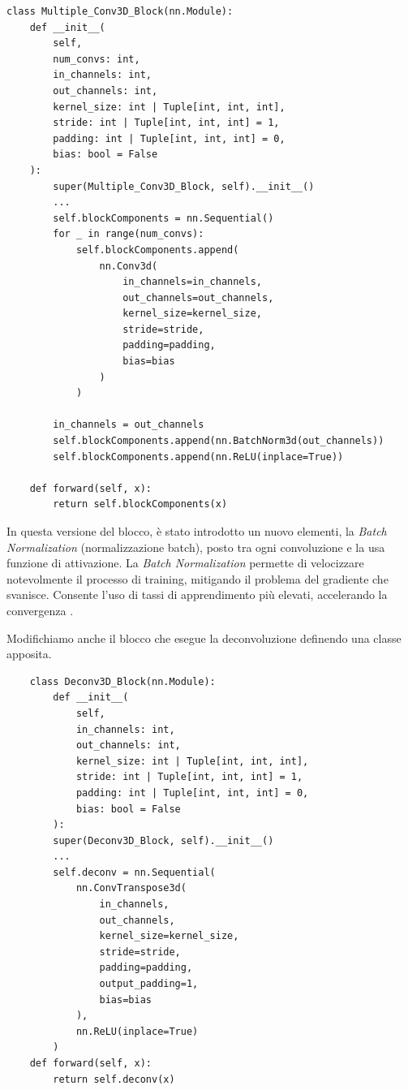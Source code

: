 \begin{lstlisting}
class Multiple_Conv3D_Block(nn.Module):
    def __init__(
        self, 
        num_convs: int, 
        in_channels: int, 
        out_channels: int, 
        kernel_size: int | Tuple[int, int, int], 
        stride: int | Tuple[int, int, int] = 1, 
        padding: int | Tuple[int, int, int] = 0, 
        bias: bool = False
    ):
        super(Multiple_Conv3D_Block, self).__init__()
        ...
        self.blockComponents = nn.Sequential()     
        for _ in range(num_convs):  
            self.blockComponents.append(
                nn.Conv3d(
                    in_channels=in_channels, 
                    out_channels=out_channels, 
                    kernel_size=kernel_size, 
                    stride=stride, 
                    padding=padding, 
                    bias=bias
                )
            )
                
        in_channels = out_channels
        self.blockComponents.append(nn.BatchNorm3d(out_channels))
        self.blockComponents.append(nn.ReLU(inplace=True))
        
    def forward(self, x):
        return self.blockComponents(x)
\end{lstlisting}

In questa versione del blocco, è stato introdotto un nuovo elementi, la 
\textit{Batch Normalization} (normalizzazione batch), posto tra ogni convoluzione 
e la usa funzione di attivazione. La \textit{Batch Normalization} permette di 
velocizzare notevolmente il processo di training, mitigando il problema del 
gradiente che svanisce. Consente l'uso di tassi di apprendimento più elevati, 
accelerando la convergenza \cite{Batch_Normalization}.

Modifichiamo anche il blocco che esegue la deconvoluzione definendo una classe 
apposita.
\begin{lstlisting}
    class Deconv3D_Block(nn.Module):
        def __init__(
            self, 
            in_channels: int, 
            out_channels: int, 
            kernel_size: int | Tuple[int, int, int], 
            stride: int | Tuple[int, int, int] = 1, 
            padding: int | Tuple[int, int, int] = 0, 
            bias: bool = False
        ):
        super(Deconv3D_Block, self).__init__()
        ...
        self.deconv = nn.Sequential(
            nn.ConvTranspose3d(
                in_channels, 
                out_channels, 
                kernel_size=kernel_size,
                stride=stride, 
                padding=padding, 
                output_padding=1, 
                bias=bias
            ),
            nn.ReLU(inplace=True)
        )
    def forward(self, x):
        return self.deconv(x)
\end{lstlisting}

